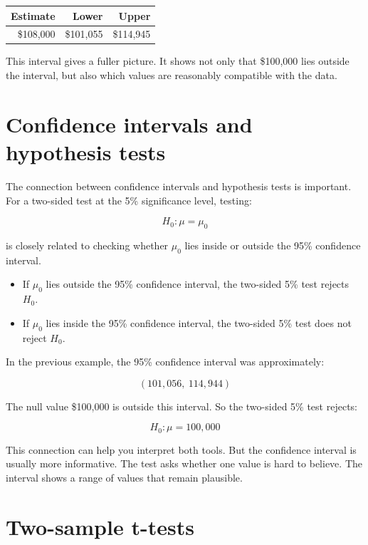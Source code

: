 \documentclass[
  letterpaper,
  DIV=11,
  numbers=noendperiod]{scrreprt}
\providecommand{\tightlist}{%
  \setlength{\itemsep}{0pt}\setlength{\parskip}{0pt}}
\begin{document}
\begin{table}
\fontsize{12.0pt}{14.0pt}\selectfont
\begin{tabular*}{\linewidth}{@{\extracolsep{\fill}}rrr}
\toprule
Estimate & Lower & Upper \\ 
\midrule\addlinespace[2.5pt]
\$108,000 & \$101,055 & \$114,945 \\ 
\bottomrule
\end{tabular*}
\end{table}

This interval gives a fuller picture. It shows not only that \$100,000
lies outside the interval, but also which values are reasonably
compatible with the data.

\section{Confidence intervals and hypothesis
tests}\label{confidence-intervals-and-hypothesis-tests}

The connection between confidence intervals and hypothesis tests is
important. For a two-sided test at the 5\% significance level, testing:

\[
H_0: \mu = \mu_0
\]

is closely related to checking whether \(\mu_0\) lies inside or outside
the 95\% confidence interval.

\begin{itemize}
\tightlist
\item
  If \(\mu_0\) lies outside the 95\% confidence interval, the two-sided
  5\% test rejects \(H_0\).
\item
  If \(\mu_0\) lies inside the 95\% confidence interval, the two-sided
  5\% test does not reject \(H_0\).
\end{itemize}

In the previous example, the 95\% confidence interval was approximately:

\[
(101{,}056,\ 114{,}944)
\]

The null value \$100,000 is outside this interval. So the two-sided 5\%
test rejects:

\[
H_0: \mu = 100{,}000
\]

This connection can help you interpret both tools. But the confidence
interval is usually more informative. The test asks whether one value is
hard to believe. The interval shows a range of values that remain
plausible.

\section{Two-sample t-tests}\label{two-sample-t-tests}
\end{document}

